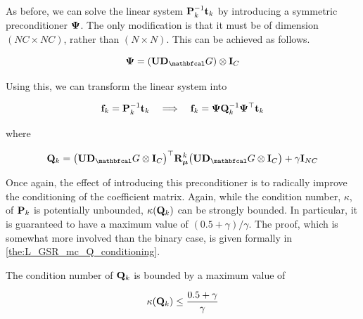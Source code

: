 As before, we can solve the linear system $\mathbf{P}^{-1}_k \mathbf{t}_k$ by introducing a symmetric preconditioner $\mathbf{\Psi}$. The only modification is that it must be of dimension $(NC \times NC)$, rather than $(N \times N)$. This can be achieved as follows. 

\begin{equation*}
    \PSI = \left(\U \D_\Gt\right) \otimes \I_C 
\end{equation*}

Using this, we can transform the linear system into 

\begin{equation*}
    \mathbf{f}_k = \mathbf{P}^{-1}_k \mathbf{t}_k \quad \Longrightarrow \quad \mathbf{f}_k = \mathbf{\Psi} \mathbf{Q}_k^{-1} \mathbf{\Psi}^\top \mathbf{t}_k
\end{equation*}

where 

\begin{equation}
    \label{eq:Q_LGSR_mc}
    \Q_k = \big(\U \D_\Gt \otimes \I_C\big)^\top  \RR_{\muu}^k \big(\U \D_\Gt \otimes \I_C\big) + \gamma \I_{NC}
\end{equation}

Once again, the effect of introducing this preconditioner is to radically improve the conditioning of the coefficient matrix. Again, while the condition number, $\kappa$, of $\mathbf{P}_k$ is potentially unbounded, $\kappa(\mathbf{Q}_k)$ can be strongly bounded. In particular, it is guaranteed to have a maximum value of $(0.5 + \gamma) / \gamma$. The proof, which is somewhat more involved than the binary case, is given formally in \cref{the:L_GSR_mc_Q_conditioning}. 

\begin{theorem}
    \label{the:L_GSR_mc_Q_conditioning}
    
    The condition number of $\mathbf{Q}_k$ is bounded by a maximum value of 
    
    \begin{equation}
        \kappa(\mathbf{Q}_k) \leq \frac{0.5 + \gamma}{\gamma}
    \end{equation}

\end{theorem}

